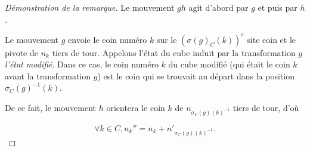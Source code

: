 \documentclass[french]{report}
\newtheorem*{remark}{Remarque}
\begin{document}
\begin{proof}[Démonstration de la remarque]
  Le mouvement $gh$ agit d'abord par $g$ et puis par $h$.

  Le mouvement $g$ envoie le coin numéro $k$ sur le $(\sigma(g)_C(k)) ^{e}$ site coin et le pivote de $n_k$ tiers de tour. Appelons l'état du cube induit par la transformation $g$ \emph{l'état modifié}. Dans ce cas, le coin numéro $k$ du cube modifié (qui était le coin $k$ avant la transformation $g$) est le coin qui se trouvait au départ dans la position $\sigma_C(g) ^{-1} (k)$.

  De ce fait, le mouvement $h$ orientera le coin $k$ de $n _{\sigma_C(g)(k) ^{-1} }$ tiers de tour, d'où

  $$ \forall k \in C, n_{k}'' = n_k+ n' _{\sigma_C(g)(k) ^{-1} }.$$
\end{proof}


\end{document}
